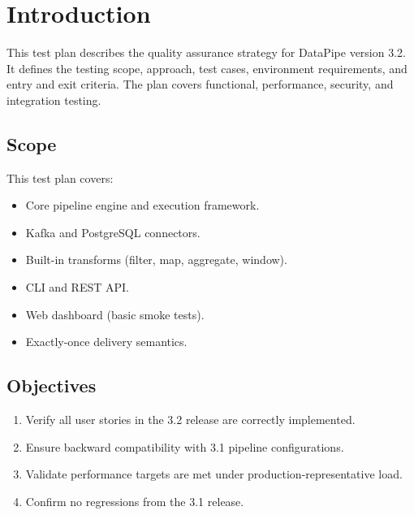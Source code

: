 \documentclass[
    language=english,
    doctype=technical-report,
    institution=none,
    titlestyle=book,
    oneside,
]{../../omnilatex}
\begin{document}
\maketitle

\tableofcontents

\chapter{Introduction}
\label{sec:introduction}

This test plan describes the quality assurance strategy for DataPipe
version 3.2. It defines the testing scope, approach, test cases,
environment requirements, and entry and exit criteria. The plan covers
functional, performance, security, and integration testing.

\section{Scope}

This test plan covers:

\begin{itemize}
    \item Core pipeline engine and execution framework.
    \item Kafka and PostgreSQL connectors.
    \item Built-in transforms (filter, map, aggregate, window).
    \item CLI and REST API.
    \item Web dashboard (basic smoke tests).
    \item Exactly-once delivery semantics.
\end{itemize}

\section{Objectives}

\begin{enumerate}
    \item Verify all user stories in the 3.2 release are correctly
        implemented.
    \item Ensure backward compatibility with 3.1 pipeline configurations.
    \item Validate performance targets are met under production-representative
        load.
    \item Confirm no regressions from the 3.1 release.
\end{enumerate}
\end{document}
